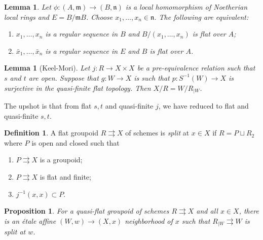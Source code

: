 \documentclass{amsart}
\newtheorem{prop}[thm]{Proposition}
\newtheorem{lem}[thm]{Lemma}
\theoremstyle{definition}
\newtheorem{defn}[thm]{Definition}
\theoremstyle{remark}
\theoremstyle{plain}
\theoremstyle{definition}
\theoremstyle{remark}
\newcommand{\mf}[1]{\mathfrak{#1}}
\newcommand{\1}{\mathbf{1}}
\newcommand{\2}{\mathbf{2}}
\newcommand{\3}{\mathbf{3}}
\begin{document}
        \begin{lem}
            Let \(\phi \colon (A,\mf{m}) \to (B, \mf{n})\) is a local homomorphism of Noetherian local rings and \(E = B / \mf{m}B\). Choose \(x_1, \ldots, x_n \in \mf{n}\). The following are equivalent:
            \begin{enumerate}
                \item \(x_1, \ldots, x_n\) is a regular sequence in \(B\) and \(B / (x_1, \ldots, x_n)\) is flat over \(A\);
                \item \(\bar{x}_1, \ldots, \bar{x}_n\) is a regular sequence in \(E\) and \(B\) is flat over \(A\).
            \end{enumerate} 
        \end{lem}

\begin{lem}[Keel-Mori]
    Let \(j \colon R \to X \times X\) be a pre-equivalence relation such that \(s\) and \(t\) are open. Suppose that \(g \colon W \to X\) is such that \(p \colon S^{-1}(W) \to X\) is surjective in the quasi-finite flat topology. Then \(X/R = W / R_{|W}\).
\end{lem}

The upshot is that from flat \(s,t\) and quasi-finite \(j\), we have reduced to flat and quasi-finite \(s,t\).

\begin{defn}
    A flat groupoid \(R \rightrightarrows X\) of schemes is \textit{split} at \(x \in X\) if \(R = P \sqcup R_2\) where \(P\) is open and closed such that
    \begin{enumerate}
        \item \(P \rightrightarrows X\) is a groupoid;
        \item \(P \rightrightarrows X\) is flat and finite;
        \item \(j^{-1}(x,x) \subset P\).
    \end{enumerate}
\end{defn}

\begin{prop}
    For a quasi-flat groupoid of schemes \(R \rightrightarrows X\) and all \(x \in X\), there is an \'etale affine \((W,w) \to (X,x)\) neighborhood of \(x\) such that \(R_{|W} \rightrightarrows W\) is split at \(w\).
\end{prop}
\end{document}
